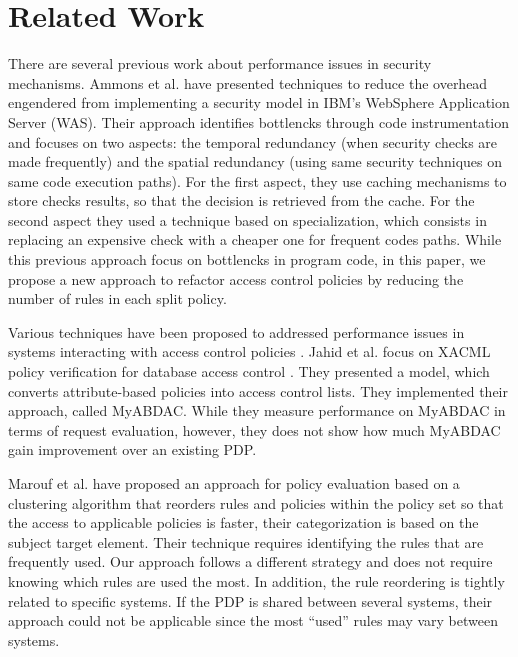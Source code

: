 \section{Related Work} \label{sec:related}

There are several previous work about performance issues in security mechanisms.
Ammons et al. have presented techniques\cite{largesystems} to reduce the overhead engendered from implementing a security model 
in IBM's WebSphere Application Server (WAS). Their approach identifies bottlencks through code instrumentation and focuses on two aspects: the temporal redundancy (when security checks are made frequently) and the spatial redundancy
(using same security techniques on same code execution paths).
For the first aspect, they use caching mechanisms to store checks results, so that the decision is retrieved from the cache.
For the second aspect they used a technique based on specialization, which consists in replacing an expensive check with a cheaper one for frequent codes paths.
While this previous approach focus on bottlencks in program code, in this paper, we propose a new
approach to refactor access control policies by reducing the number of rules in each split policy.



Various techniques have been proposed to addressed performance issues in systems interacting with access control policies
\cite{MyABDAC, clustering, decomposition}.
Jahid et al. focus on XACML
policy verification for database access control \cite{MyABDAC}. They presented a model, which converts attribute-based policies into access control lists. They implemented their approach, called MyABDAC.
While they measure performance on MyABDAC in terms of request evaluation, however, they does not show how much MyABDAC
gain improvement over an existing PDP.


Marouf et al. have proposed an approach \cite{clustering} for policy evaluation based on a 
clustering algorithm that reorders rules and policies within the policy set so that the access to applicable policies is faster, their categorization is based on
 the subject target element. Their technique requires identifying the rules that are frequently used. Our approach follows a different strategy and does not require knowing which 
rules are used the most. In addition, the rule reordering is tightly related to specific systems. If the PDP is shared between several
 systems, their approach could not be applicable since the most ``used'' rules may vary between systems. \\


